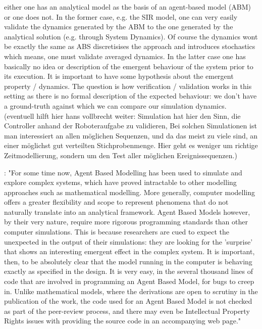either one has an analytical model as the basis of an agent-based model (ABM) or one does not.
In the former case, e.g. the SIR model, one can very easily validate the dynamics generated by the ABM to the one generated by the analytical solution (e.g. through System Dynamics). Of course the dynamics wont be exactly the same as ABS discretisises the approach and introduces stochastics which means, one must validate averaged dynamics.
In the latter case one has basically no idea or description of the emergent behaviour of the system prior to its execution. It is important to have some hypothesis about the emergent property / dynamics. The question is how verification / validation works in this setting as there is no formal description of the expected behaviour: we don't have a ground-truth against which we can compare our simulation dynamics. (eventuell hilft hier hans vollbrecht weiter: Simulation hat hier den Sinn, die Controller anhand der Roboteraufgabe zu validieren, Bei solchen Simulationen ist man interessiert an allen möglichen Sequenzen, und da das meist zu viele sind, an einer möglichst gut verteilten Stichprobenmenge. Hier geht es weniger um richtige Zeitmodellierung, sondern um den Test aller möglichen Ereignissequenzen.)

\cite{polhill_ghost_2005}: "For some time now, Agent Based Modelling has been used to simulate and explore complex systems, which have proved intractable to other modelling approaches such as mathematical modelling. More generally, computer modelling offers a greater flexibility and scope to represent phenomena that do not naturally translate into an analytical framework. Agent Based Models however, by their very nature, require more rigorous programming standards than other computer simulations. This is because researchers are cued to expect the unexpected in the output of their simulations: they are looking for the 'surprise' that shows an interesting emergent effect in the complex system. It is important, then, to be absolutely clear that the model running in the computer is behaving exactly as specified in the design. It is very easy, in the several thousand lines of code that are involved in programming an Agent Based Model, for bugs to creep in. Unlike mathematical models, where the derivations are open to scrutiny in the publication of the work, the code used for an Agent Based Model is not checked as part of the peer-review process, and there may even be Intellectual Property Rights issues with providing the source code in an accompanying web page."

